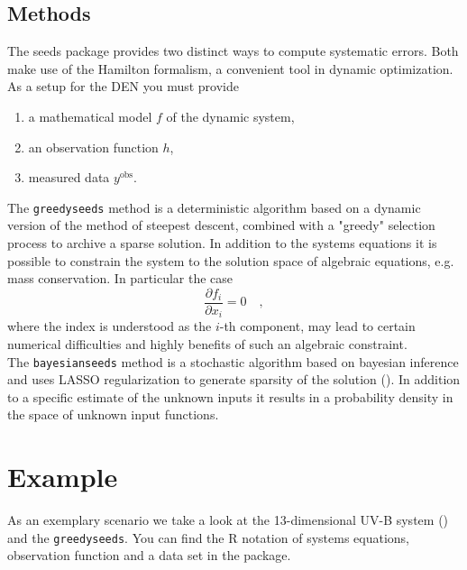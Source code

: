 \documentclass{bioinfo}
\begin{document}
\begin{methods}
\section{Methods}
	The \textsf{seeds} package provides two distinct ways to compute systematic errors. Both 
	make use of the Hamilton formalism, a convenient tool in dynamic optimization. As a setup 
	for the DEN you must provide
	\begin{enumerate}
		\item a mathematical model $f$ of the dynamic system,
		\item an observation function $h$,
		\item measured data $y^\text{obs}$. 
	\end{enumerate}
	The \texttt{greedyseeds} method is a deterministic algorithm based on a dynamic version of 
	the method of steepest descent, combined with a "greedy" selection process to archive a 
	sparse solution. In addition to the systems equations it is possible to constrain the 
	system to the solution space of algebraic equations, e.g. mass conservation. In particular 
	the case
	\begin{equation}
		\frac{\partial f_i}{\partial x_i} = 0 \quad ,
	\end{equation} 
	where the index is understood as the $i$-th component, may lead to certain numerical 
	difficulties and highly benefits of such an algebraic constraint.\\
	
	The \texttt{bayesianseeds} method is a stochastic algorithm based on bayesian 
	inference and uses LASSO regularization to generate sparsity of the solution 
	(\citealp{BDEN}). 
	In addition to a specific estimate of the unknown inputs it results in a probability 
	density in the space of unknown input functions.
\end{methods}

\section{Example}
	As an exemplary scenario we take a look at the 13-dimensional UV-B system (\citealp{UVB}) 
	and the \texttt{greedyseeds}. You can find the R notation of systems equations, 
	observation function and a data set in the package. 
\end{document}
